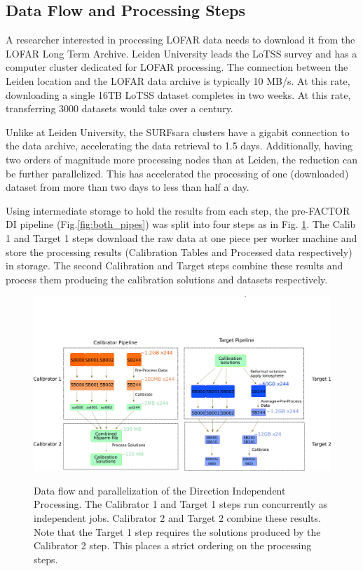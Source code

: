 \subsection{Data Flow and Processing Steps}\label{sec:dataflow}

A researcher interested in processing LOFAR data needs to download it from the LOFAR Long Term Archive. Leiden University leads the LoTSS survey and has a computer cluster dedicated for LOFAR processing. The connection between the Leiden location and the LOFAR data archive is typically 10 MB/s. At this rate, downloading a single 16TB LoTSS dataset completes in two weeks. At this rate, transferring 3000 datasets would take over a century. 

Unlike at Leiden University, the SURFsara clusters have a gigabit connection to the data archive, accelerating the data retrieval to 1.5 days. Additionally, having two orders of magnitude more processing nodes than at Leiden, the reduction can be further parallelized. This has accelerated the processing of one (downloaded) dataset from more than two days to less than half a day.

Using intermediate storage to hold the results from each step, the pre-FACTOR DI pipeline (Fig.\ref{fig:both_pipes}) was split into four steps as in Fig. \ref{fig:DIpipe}. The Calib 1 and Target 1 steps download the raw data at one piece per worker machine and store the processing results (Calibration Tables and Processed data respectively) in storage. The second Calibration and Target steps combine these results and process them producing the calibration solutions and datasets respectively. 


\begin{figure}
 \includegraphics[width=.79\textwidth]{ch3/figures/Pipeline_parallel.png}\\
 \caption{Data flow and parallelization of the Direction Independent Processing. The Calibrator 1 and Target 1 steps run concurrently as independent jobs. Calibrator 2 and Target 2 combine these results. Note that the Target 1 step requires the solutions produced by the Calibrator 2 step. This places a strict ordering on the processing steps. }
 \label{fig:DIpipe}
\end{figure}



